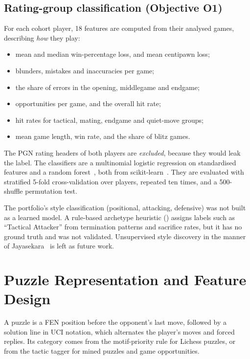 \subsection{Rating-group classification (Objective O1)}\label{sec:rating-method}

For each cohort player, 18 features are computed from their analysed games, describing \emph{how}
they play:
\begin{itemize}
  \item mean and median win-percentage loss, and mean centipawn loss;
  \item blunders, mistakes and inaccuracies per game;
  \item the share of errors in the opening, middlegame and endgame;
  \item opportunities per game, and the overall hit rate;
  \item hit rates for tactical, mating, endgame and quiet-move groups;
  \item mean game length, win rate, and the share of blitz games.
\end{itemize}
The PGN rating headers of both players are \emph{excluded}, because they would leak the label. The
classifiers are a multinomial logistic regression on standardised features and a random
forest~\cite{breiman2001random}, both from scikit-learn~\cite{pedregosa2011scikit}. They are
evaluated with stratified 5-fold cross-validation over players, repeated ten times, and a
500-shuffle permutation test.

\begin{honest}
The portfolio's style classification (positional, attacking, defensive) was not built as a learned
model. A rule-based archetype heuristic () assigns labels such as ``Tactical
Attacker'' from termination patterns and sacrifice rates, but it has no ground truth and was not
validated. Unsupervised style discovery in the manner of Jayasekara~\cite{jayasekara2018classification}
is left as future work.
\end{honest}

\section{Puzzle Representation and Feature Design}\label{sec:features}

A puzzle is a FEN position before the opponent's last move, followed by a solution line in UCI
notation, which alternates the player's moves and forced replies. Its category comes from the
motif-priority rule for Lichess puzzles, or from the tactic tagger for mined puzzles and game
opportunities.

